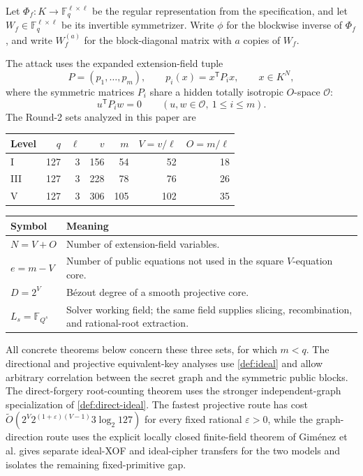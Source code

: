 \documentclass[11pt,a4paper]{article}
\theoremstyle{definition}
\theoremstyle{remark}
\newcommand{\F}{\mathbb F}
\newcommand{\cO}{\mathcal O}
\newcommand{\softO}{\widetilde O}
\begin{document}
Let $\Phi_f:K\to\F_q^{\ell\times\ell}$ be the regular representation from the specification, and let $W_f\in\F_q^{\ell\times\ell}$ be its invertible symmetrizer.  Write $\phi$ for the blockwise inverse of $\Phi_f$, and write $W_f^{(a)}$ for the block-diagonal matrix with $a$ copies of $W_f$.

The attack uses the expanded extension-field tuple
\[
P=(p_1,\ldots,p_m),\qquad p_i(x)=x^{\mathsf T}P_ix,
\qquad x\in K^{N},
\]
where the symmetric matrices $P_i$ share a hidden totally isotropic $O$-space $\cO$:
\begin{equation}\label{eq:isotropy}
u^{\mathsf T}P_iw=0\qquad(u,w\in\cO,\ 1\le i\le m).
\end{equation}
The Round-2 sets analyzed in this paper are
\begin{center}
\begin{tabular}{@{}lrrrrrr@{}}
\toprule
Level & $q$ & $\ell$ & $v$ & $m$ & $V=v/\ell$ & $O=m/\ell$\\
\midrule
I&127&3&156&54&52&18\\
III&127&3&228&78&76&26\\
V&127&3&306&105&102&35\\
\bottomrule
\end{tabular}
\end{center}

\begin{center}
\small
\setlength{\tabcolsep}{5pt}
\begin{tabularx}{0.94\textwidth}{@{}>{\bfseries}p{}X@{}}
\toprule
Symbol & Meaning \\
\midrule
$N=V+O$ & Number of extension-field variables. \\
$e=m-V$ & Number of public equations not used in the square $V$-equation core. \\
$D=2^V$ & B\'ezout degree of a smooth projective core. \\
$L_s=\F_{Q^s}$ & Solver working field; the same field supplies slicing, recombination, and rational-root extraction. \\
\bottomrule
\end{tabularx}
\end{center}

All concrete theorems below concern these three sets, for which $m<q$.  The directional and projective equivalent-key analyses use \cref{def:ideal} and allow arbitrary correlation between the secret graph and the symmetric public blocks.  The direct-forgery root-counting theorem uses the stronger independent-graph specialization of \cref{def:direct-ideal}.  The fastest projective route has cost $\softO(2^V2^{(1+\varepsilon)(V-1)}3\log_2 127)$ for every fixed rational $\varepsilon>0$, while the graph-direction route uses the explicit locally closed finite-field theorem of Gim\'enez et al.   gives separate ideal-XOF and ideal-cipher transfers for the two models and isolates the remaining fixed-primitive gap.
\end{document}
